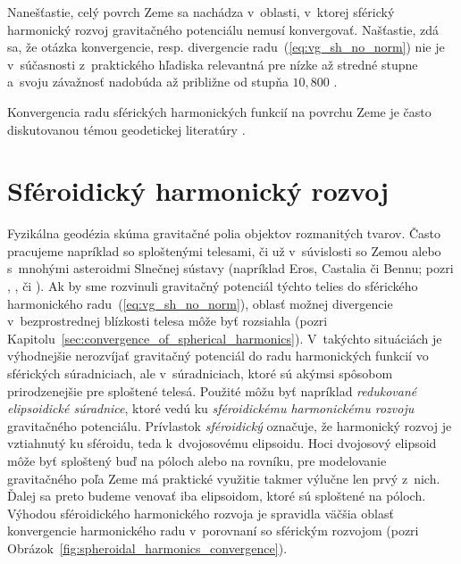 \documentclass[a4paper, 12pt]{book}
\begin{document}
Nanešťastie, celý povrch Zeme sa nachádza v~oblasti, v~ktorej sférický 
harmonický rozvoj gravitačného potenciálu nemusí konvergovať.  Našťastie, zdá 
sa, že otázka konvergencie, resp. divergencie radu~(\ref{eq:vg_sh_no_norm}) nie 
je v~súčasnosti z~praktického hľadiska relevantná pre nízke až stredné stupne 
a~svoju závažnosť nadobúda až približne od stupňa $10{,}800$ 
\parencite{Hirt2016,Rexer2017}.

Konvergencia radu sférických harmonických funkcií na povrchu Zeme je často 
diskutovanou témou geodetickej literatúry 
\parencite{Hotine,Borre_chapter4,MoritzAdvancedGeodesy,Sjoberg1980,Jekeli1983,SansoGeoidDetermination}.







\chapter{Sféroidický harmonický rozvoj}
\label{sec:spheroidal_harmonics_chapter}

Fyzikálna geodézia skúma gravitačné polia objektov rozmanitých tvarov.  Často 
pracujeme napríklad so sploštenými telesami, či už v~súvislosti so Zemou alebo 
s~mnohými asteroidmi Slnečnej sústavy (napríklad Eros, Castalia či Bennu; pozri 
\cite{Garmier2001}, \cite{Hu2015}, \cite{Sebera2016} či \cite{Reimond2016}).  
Ak by sme rozvinuli gravitačný potenciál týchto telies do sférického 
harmonického radu~(\ref{eq:vg_sh_no_norm}), oblasť možnej divergencie 
v~bezprostrednej blízkosti telesa môže byť rozsiahla (pozri 
Kapitolu~\ref{sec:convergence_of_spherical_harmonics}).  V~takýchto situáciách 
je výhodnejšie nerozvíjať gravitačný potenciál do radu harmonických funkcií vo 
sférických súradniciach, ale v~súradniciach, ktoré sú akýmsi spôsobom 
prirodzenejšie pre sploštené telesá.  Použité môžu byť napríklad 
\emph{redukované elipsoidické súradnice}, ktoré vedú ku \emph{sféroidickému 
harmonickému rozvoju} gravitačného potenciálu.  Prívlastok \emph{sféroidický} 
označuje, že harmonický rozvoj je vztiahnutý ku sféroidu, teda k~dvojosovému 
elipsoidu.  Hoci dvojosový elipsoid môže byť sploštený buď na póloch alebo na 
rovníku, pre modelovanie gravitačného poľa Zeme má praktické využitie takmer 
výlučne len prvý z~nich.  Ďalej sa preto budeme venovať iba elipsoidom, ktoré 
sú sploštené na póloch.  Výhodou sféroidického harmonického rozvoja je 
spravidla väčšia oblasť konvergencie harmonického radu v~porovnaní so sférickým 
rozvojom (pozri Obrázok~\ref{fig:spheroidal_harmonics_convergence}).
\end{document}

